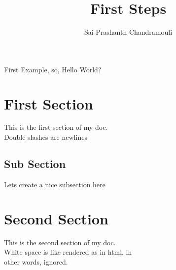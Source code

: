 \documentclass[a4paper,12pt,titlepage]{article} %
\author{Sai Prashanth Chandramouli}
\title{First Steps}
\begin{document}
	\maketitle
	\tableofcontents
	First Example, so, Hello World?
	\section{First Section}
		This is the first section of my doc.\\
		Double slashes are newlines
		\subsection[Sub Short]{Sub Section}
			Lets create a nice subsection here
	\section[Short Title]{Second Section}	
		This is the second section of my doc.\\
		White space is like rendered as in html, in\\
		other words, ignored.
\end{document}
